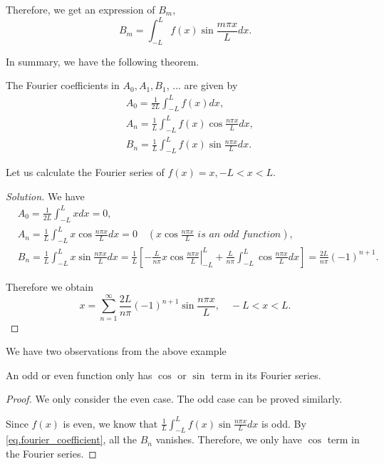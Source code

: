 Therefore, we get an expression of $B_m$,
$$
B_m = \int_{-L}^L f(x) \sin \frac{m \pi x}{L} d x.
$$

In summary, we have the following theorem.

\begin{theorem}[]
The Fourier coefficients in $A_0, A_1, B_1$, $\dots$ are given by
\begin{equation}\label{eq.fourier_coefficient}
    \begin{aligned}
        \,&A_0=\frac{1}{2 L} \int_{-L}^L f(x) d x, 
        \\
        &A_n=\frac{1}{L} \int_{-L}^L f(x) \cos \frac{n \pi x}{L} d x, 
        \\
        &B_n=\frac{1}{L} \int_{-L}^L f(x) \sin \frac{n \pi x}{L} d x.
    \end{aligned}
\end{equation}
\end{theorem}

\begin{example}[]\label{ex.x_fourier}
Let us calculate the Fourier series of $f(x)=x,-L<x<L$. 
\end{example}
\begin{proof}[Solution]
    We have
    $$
    \begin{aligned}
    & A_0=\frac{1}{2 L} \int_{-L}^L x d x=0, 
    \\
    & A_n=\frac{1}{L} \int_{-L}^L x \cos \frac{n \pi x}{L} d x=0 \quad (x \cos \frac{n \pi x}{L} \textit{ is an odd function}), 
    \\
    & B_n=\frac{1}{L} \int_{-L}^L x \sin \frac{n \pi x}{L} d x=\frac{1}{L}\left[-\left.\frac{L}{n \pi} x \cos \frac{n \pi x}{L}\right|_{-L} ^L+\frac{L}{n \pi} \int_{-L}^L \cos \frac{n \pi x}{L} d x\right]=\frac{2 L}{n \pi}(-1)^{n+1} .
    \end{aligned}
    $$
    
    Therefore we obtain
    \begin{equation}\label{eq.fourier_x}
        x=\sum_{n=1}^{\infty} \frac{2 L}{n \pi}(-1)^{n+1} \sin \frac{n \pi x}{L}, \quad-L<x<L .
    \end{equation}
    
\end{proof}

We have two observations from the above example

\begin{proposition}[]\label{prop.odd_even_sin_cos}
    An odd or even function only has $\cos$ or  $\sin$ term in its Fourier series.
\end{proposition}
\begin{proof}
    We only consider the even case. The odd case can be proved similarly. 
    
    Since $f(x)$ is even, we know that $\frac{1}{L} \int_{-L}^L f(x) \sin \frac{n \pi x}{L} d x$ is odd. By \eqref{eq.fourier_coefficient}, all the $B_n$ vanishes. Therefore, we only have $\cos$ term in the Fourier series.
\end{proof}

